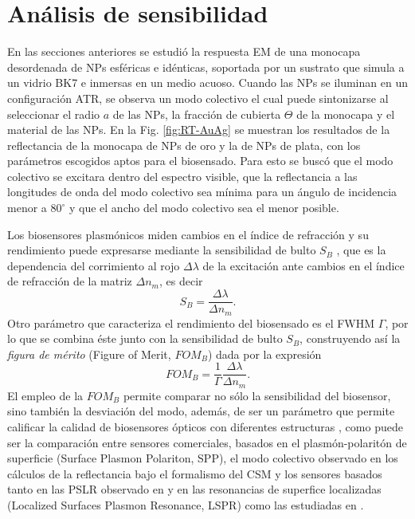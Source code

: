 \section{Análisis de sensibilidad}
\label{section:sensLambda}

En las secciones anteriores se estudió la respuesta EM de una monocapa desordenada de NPs esféricas e idénticas, soportada por un sustrato que simula a un vidrio BK7 e inmersas en un medio acuoso. Cuando las NPs se iluminan en un configuración ATR, se observa un modo colectivo el cual puede sintonizarse al seleccionar el radio $a$ de las NPs, la fracción de cubierta $\Theta$ de la monocapa y el material de las NPs. En la Fig. \ref{fig:RT-AuAg} se muestran los resultados de la reflectancia de la monocapa de NPs de oro y la de NPs de plata, con los parámetros escogidos aptos para el biosensado. Para esto se buscó que el modo colectivo se excitara dentro del espectro visible, que la reflectancia a las longitudes de onda del modo colectivo sea mínima para un ángulo de incidencia menor a $80^\circ$ y que el ancho del modo colectivo sea el menor posible.

Los biosensores plasmónicos miden cambios en el índice de refracción y su rendimiento puede expresarse mediante la sensibilidad de bulto $S_B$ \cite{estevez2014trends,svedendahl2009refractometric}, que es la dependencia del corrimiento al rojo $\Delta \lambda$ de la excitación ante cambios en el índice de refracción de la matriz $\Delta n_m$, es decir
	\begin{equation}
	S_B = \frac{\Delta \lambda}{\Delta n_m}.
	\end{equation}
Otro parámetro que caracteriza el rendimiento del biosensado es el FWHM $\Gamma$, por lo que se combina éste junto con la sensibilidad de bulto $S_B$, construyendo así la \emph{figura de mérito} (Figure of Merit, $FOM_B$) dada por la expresión
	\begin{equation}
	FOM_B = \frac{1}{\Gamma}\frac{\Delta \lambda}{\Delta n_m}.
	\end{equation}
El empleo de la $FOM_B$ permite comparar no sólo la sensibilidad del biosensor, sino también la desviación del modo, además, de ser un parámetro que permite calificar la calidad de biosensores ópticos con diferentes estructuras \cite{svedendahl2009refractometric}, como puede ser la comparación entre sensores comerciales, basados en el plasmón-polaritón de superficie (Surface Plasmon Polariton, SPP), el modo colectivo observado en los cálculos de la reflectancia bajo el formalismo del CSM y los sensores basados tanto en las PSLR observado en \cite{kabashin2009plasmonic,danilov2018ultra} y en las resonancias de superfice localizadas (Localized Surfaces Plasmon Resonance, LSPR) como las estudiadas en \cite{svedendahl2009refractometric}.




